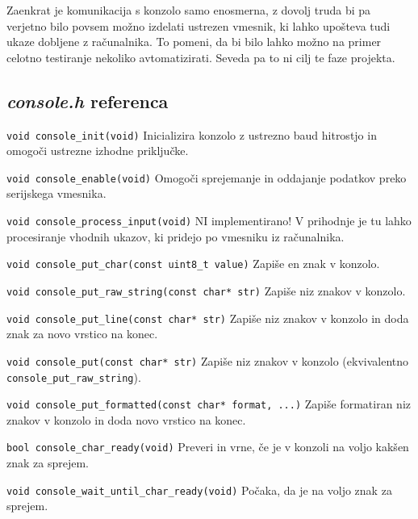 \documentclass[12pt,a4paper,twoside,openright,slovene]{book}
\begin{document}
Zaenkrat je komunikacija s konzolo samo enosmerna, z dovolj truda bi pa verjetno bilo povsem možno izdelati ustrezen vmesnik, ki lahko upošteva tudi ukaze dobljene z računalnika. To pomeni, da bi bilo lahko možno na primer celotno testiranje nekoliko avtomatizirati. Seveda pa to ni cilj te faze projekta.

\subsection{\textit{console.h} referenca}

\lstinline{void console_init(void)}\newline
Inicializira konzolo z ustrezno baud hitrostjo in omogoči ustrezne izhodne priključke.

\lstinline{void console_enable(void)}\newline
Omogoči sprejemanje in oddajanje podatkov preko serijskega vmesnika.

\lstinline{void console_process_input(void)}\newline
NI implementirano! V prihodnje je tu lahko procesiranje vhodnih ukazov, ki pridejo po vmesniku iz računalnika.

\lstinline{void console_put_char(const uint8_t value)}\newline
Zapiše en znak v konzolo.

\lstinline{void console_put_raw_string(const char* str)}\newline
Zapiše niz znakov v konzolo.

\lstinline{void console_put_line(const char* str)}\newline
Zapiše niz znakov v konzolo in doda znak za novo vrstico na konec.

\lstinline{void console_put(const char* str)}\newline
Zapiše niz znakov v konzolo (ekvivalentno \lstinline{console_put_raw_string}).

\lstinline{void console_put_formatted(const char* format, ...)}\newline
Zapiše formatiran niz znakov v konzolo in doda novo vrstico na konec.

\lstinline{bool console_char_ready(void)}\newline
Preveri in vrne, če je v konzoli na voljo kakšen znak za sprejem.

\lstinline{void console_wait_until_char_ready(void)}\newline
Počaka, da je na voljo znak za sprejem.
\end{document}
